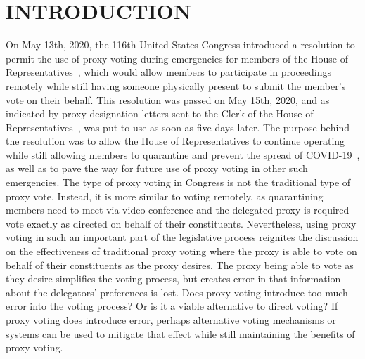 %
%

\chapter{INTRODUCTION}\label{ch:introduction}
\thispagestyle{empty}
On May 13th, 2020, the 116th United States Congress introduced a resolution
to permit the use of proxy voting during emergencies for members of the House of
Representatives~\cite{Congress.gov2020}, which would allow members to participate in
proceedings remotely while still having someone physically present to submit the
member's vote on their behalf.
This resolution was passed on May 15th, 2020, and as indicated by proxy designation
letters sent to the Clerk of the House of Representatives~\cite{Clerk.House.gov2022},
was put to use as soon as five days later.
The purpose behind the resolution was to allow the House of Representatives
to continue operating while still allowing members to quarantine and prevent the
spread of COVID-19~\cite{Congress.gov2020}, as well as to pave the way for future use
of proxy voting in other such emergencies.
The type of proxy voting in Congress is not the traditional type of proxy vote.
Instead, it is more similar to voting remotely, as quarantining members need to
meet via video conference and the delegated proxy is required vote exactly as
directed on behalf of their constituents.
Nevertheless, using proxy voting in such an important part of the legislative process
reignites the discussion on the effectiveness of traditional proxy voting where the
proxy is able to vote on behalf of their constituents as the proxy desires.
The proxy being able to vote as they desire simplifies the voting process, but
creates error in that information about the delegators' preferences is lost.
Does proxy voting introduce too much error into the voting process? 
Or is it a viable alternative to direct voting?
If proxy voting does introduce error, perhaps alternative voting mechanisms or systems
can be used to mitigate that effect while still maintaining the benefits of proxy
voting.

